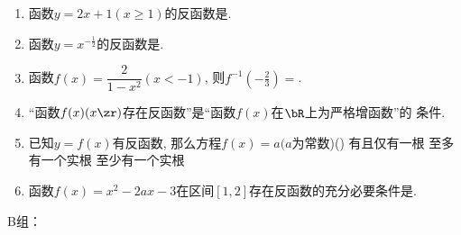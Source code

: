 \begin{enumerate}
\item 函数$y=2x+1(x\geq1)$的反函数是. 

\item 函数$y=x^{-\frac{1}{2}}$的反函数是. 

\item 函数$f(x)=\dfrac{2}{1-x^2}(x<-1)$, 则$f^{-1}(-\frac{2}{3})=$.  

\item ``函数$f(x)(x\zr)$存在反函数''是``函数$f(x)$在$\bR$上为严格增函数''的 条件. 


\item 已知$y=f(x)$有反函数, 那么方程$f(x)=a(a$为常数)\dotfill()
{有且仅有一根}
{至多有一个实根}
{至少有一个实根}


\item 函数$f(x)=x^2-2ax-3$在区间$[1,2]$存在反函数的充分必要条件是\blkda[4]{$a\in(-\infty,1]\cup[2,+\infty)$}.


    
\end{enumerate}

B组：

